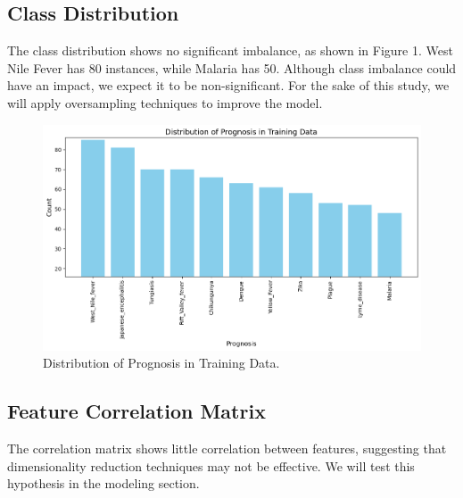\documentclass{article}
\begin{document}
\subsection{Class Distribution}

The class distribution shows no significant imbalance, as shown in Figure 1. West Nile Fever has 80
instances, while Malaria has 50. Although class imbalance could have an impact, we expect it to be
non-significant. For the sake of this study, we will apply oversampling techniques to improve the model.

\begin{figure}[t] %
    \centering
    \includegraphics[width=.8\linewidth]{DiseaseDistribution.png}
    \caption{Distribution of Prognosis in Training Data.}
    \label{fig:disease_distribution}
    \vspace{-1em} %
\end{figure}

\subsection{Feature Correlation Matrix}

The correlation matrix shows little correlation between features, suggesting that dimensionality
reduction techniques may not be effective. We will test this hypothesis in the modeling section.
\end{document}
